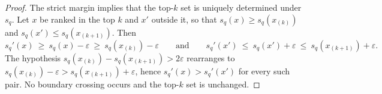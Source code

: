 \documentclass[10pt,a4paper]{amsart}
\begin{document}
\begin{proof}
The strict margin implies that the top-$k$ set is uniquely determined under $s_q$. Let $x$ be ranked in the top $k$ and $x'$ outside it, so that $s_q(x)\ge s_q(x_{(k)})$ and $s_q(x')\le s_q(x_{(k+1)})$. Then
\[
s_q'(x)\ \ge\ s_q(x)-\varepsilon\ \ge\ s_q(x_{(k)})-\varepsilon
\qquad\text{and}\qquad
s_q'(x')\ \le\ s_q(x')+\varepsilon\ \le\ s_q(x_{(k+1)})+\varepsilon .
\]
The hypothesis $s_q(x_{(k)})-s_q(x_{(k+1)})>2\varepsilon$ rearranges to $s_q(x_{(k)})-\varepsilon>s_q(x_{(k+1)})+\varepsilon$, hence $s_q'(x)>s_q'(x')$ for every such pair. No boundary crossing occurs and the top-$k$ set is unchanged.
\end{proof}
\end{document}
